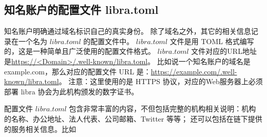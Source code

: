 \subsection{知名账户的配置文件 libra.toml}
知名账户明确通过域名标识自己的真实身份。
除了域名之外，其它的相关信息记录在一个名为 $libra.toml$ 的配置文件中。
$libra.toml$ 文件是用 TOML 格式编写的，这是一种简单且广泛使用的配置文件格式。
$libra.toml$ 文件对应的URL地址是\url{https://<Domain>/.well-known/libra.toml}。
比如说一个知名账户的域名是 example.com，那么对应的配置文件 URL 是：\url{https://example.com/.well-known/libra.toml}。
注意：这里使用的是 HTTPS 协议，对应的Web服务器上必须部署 libra 协会为此机构颁发的数字证书。

配置文件 $libra.toml$ 包含非常丰富的内容，不但包括完整的机构相关说明：机构的名称、办公地址、法人代表、公司邮箱、Twitter 等等；
还可以包括在链下提供的服务相关信息。比如

